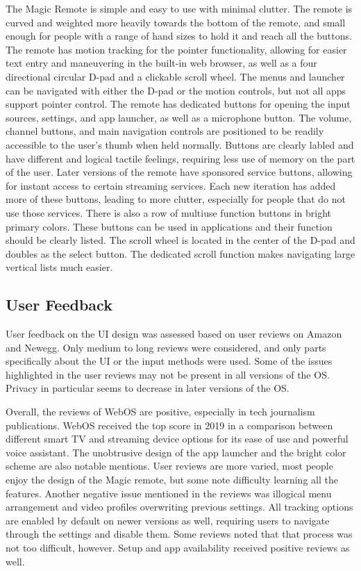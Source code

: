 \documentclass[12pt, letterpaper]{article}
\begin{document}
The Magic Remote is simple and easy to use with minimal clutter.  The remote is curved and weighted more heavily towards the bottom of the remote, and small enough for people with a range of hand sizes to hold it and reach all the buttons.  The remote has motion tracking for the pointer functionality, allowing for easier text entry and maneuvering in the built-in web browser, as well as a 
four directional circular D-pad and a clickable scroll wheel.  The menus and launcher can be navigated with either the D-pad or the motion controls, but not all apps support pointer control.  The remote has dedicated buttons for opening the input sources, settings, and app launcher, as well as a microphone button.  The volume, channel buttons, and main navigation controls are positioned to be readily accessible to the user's thumb when held normally.  
Buttons are clearly labled and have different and logical tactile feelings, requiring less use of memory on the part of the user.  Later versions of the remote have sponsored service buttons, allowing for instant access to certain streaming services.  Each new iteration has added more of these buttons, leading to more clutter, especially for people that do not use those services.
There is also a row of multi\-use function buttons in bright primary colors.  These buttons can be used in applications and their function should be clearly listed.  The scroll wheel is located in the center of the D-pad and doubles as the select button.  The dedicated scroll function makes navigating large vertical lists much easier.
\subsection{User Feedback}
User feedback on the UI design was assessed based on user reviews on Amazon and Newegg.  Only medium to long reviews were considered, and only parts specifically about the UI or the input methods were used. Some of the issues highlighted in the user reviews may not be present in all versions of the OS. Privacy in particular seems to decrease in later versions of the OS.

Overall, the reviews of WebOS are positive, especially in tech journalism publications. 
WebOS received the top score in 2019 in a comparison between different smart TV and streaming device options for its ease of use and powerful voice assistant\cite{westover_2019}. The unobtrusive design of the app launcher and the bright color scheme are also notable mentions. User reviews are more varied, most people enjoy the design of the Magic remote, but some note difficulty learning all the features. Another negative issue mentioned in the reviews was illogical menu arrangement and 
video profiles overwriting previous settings\cite{nitromethane}.  All tracking options are enabled by default on newer versions as well, requiring users to navigate through the settings and disable them.  Some reviews noted that that process was not too difficult, however. Setup and app availability received positive reviews as well\cite{christy}.
\end{document}
